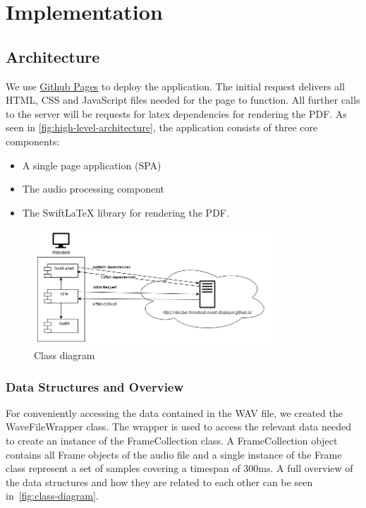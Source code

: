 \section{Implementation}\label{sec:implementation}

\subsection{Architecture}\label{subsec:architecture}
We use \href{https://decibel-threshold-event-displayer.github.io/}{Github Pages} to deploy the application.
The initial request delivers all HTML, CSS and JavaScript files needed for the page to function.
All further calls to the server will be requests for latex dependencies for rendering the PDF.
As seen in \autoref{fig:high-level-architecture}, the application consists of three core components:
\begin{itemize}
    \item A single page application (SPA)
    \item The audio processing component
    \item The SwiftLaTeX library for rendering the PDF.    
\end{itemize}


\begin{figure}[H]
    \centering
    \includegraphics[width=0.8\textwidth]{../assets/high_level_architecture.png}
    \caption{Class diagram}\label{fig:high-level-architecture}
\end{figure}

\subsubsection{Data Structures and Overview}
For conveniently accessing the data contained in the WAV file, we created the WaveFileWrapper class.
The wrapper is used to access the relevant data needed to create an instance of the FrameCollection class.
A FrameCollection object contains all Frame objects of the audio file and a single instance of the Frame class represent a set of samples covering a timespan of 300ms.
A full overview of the data structures and how they are related to each other can be seen in~\autoref{fig:class-diagram}.

